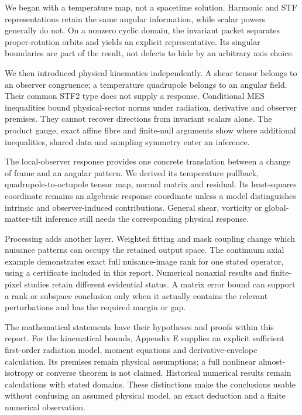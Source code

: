 \documentclass[
  11pt,
  a4paper]{article}
\begin{document}
We began with a temperature map, not a spacetime solution. Harmonic and STF representations retain the same angular information, while scalar powers generally do not. On a nonzero cyclic domain, the invariant packet separates proper-rotation orbits and yields an explicit representative. Its singular boundaries are part of the result, not defects to hide by an arbitrary axis choice.

We then introduced physical kinematics independently. A shear tensor belongs to an observer congruence; a temperature quadrupole belongs to an angular field. Their common STF2 type does not supply a response. Conditional MES inequalities bound physical-sector norms under radiation, derivative and observer premises. They cannot recover directions from invariant scalars alone. The product gauge, exact affine fibre and finite-null arguments show where additional inequalities, shared data and sampling symmetry enter an inference.

The local-observer response provides one concrete translation between a change of frame and an angular pattern. We derived its temperature pullback, quadrupole-to-octupole tensor map, normal matrix and residual. Its least-squares coordinate remains an algebraic response coordinate unless a model distinguishes intrinsic and observer-induced contributions. General shear, vorticity or global-matter-tilt inference still needs the corresponding physical response.

Processing adds another layer. Weighted fitting and mask coupling change which nuisance patterns can occupy the retained output space. The continuum axial example demonstrates exact full nuisance-image rank for one stated operator, using a certificate included in this report. Numerical nonaxial results and finite-pixel studies retain different evidential status. A matrix error bound can support a rank or subspace conclusion only when it actually contains the relevant perturbations and has the required margin or gap.

The mathematical statements have their hypotheses and proofs within this report. For the kinematical bounds, Appendix E supplies an explicit sufficient first-order radiation model, moment equations and derivative-envelope calculation. Its premises remain physical assumptions; a full nonlinear almost-isotropy or converse theorem is not claimed. Historical numerical results remain calculations with stated domains. These distinctions make the conclusions usable without confusing an assumed physical model, an exact deduction and a finite numerical observation.
\end{document}
